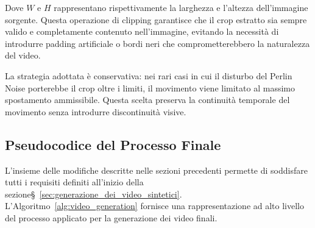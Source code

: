 Dove $W$ e $H$ rappresentano rispettivamente la larghezza e l'altezza dell'immagine sorgente. Questa operazione di clipping garantisce che il crop estratto sia sempre valido e completamente contenuto nell'immagine, evitando la necessità di introdurre padding artificiale o bordi neri che comprometterebbero la naturalezza del video.

La strategia adottata è conservativa: nei rari casi in cui il disturbo del Perlin Noise porterebbe il crop oltre i limiti, il movimento viene limitato al massimo spostamento ammissibile. Questa scelta preserva la continuità temporale del movimento senza introdurre discontinuità visive.

\subsection{Pseudocodice del Processo Finale}
L'insieme delle modifiche descritte nelle sezioni precedenti permette di soddisfare tutti i requisiti definiti all'inizio della sezione\S~\ref{sec:generazione_dei_video_sintetici}. L'Algoritmo~\ref{alg:video_generation} fornisce una rappresentazione ad alto livello del processo applicato per la generazione dei video finali.

